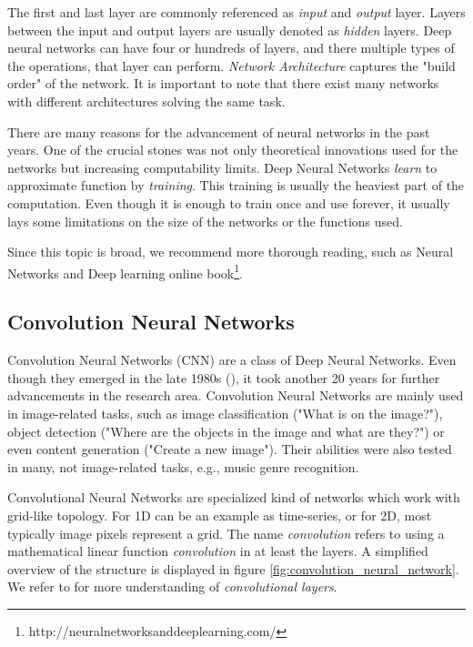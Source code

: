 The first and last layer are commonly referenced as \emph{input} and \emph{output} layer. Layers between the input and output layers are usually denoted as \emph{hidden} layers. Deep neural networks can have four or hundreds of layers, and there multiple types of the operations, that layer can perform. \emph{Network Architecture} captures the "build order" of the network. It is important to note that there exist many networks with different architectures solving the same task.

There are many reasons for the advancement of neural networks in the past years. One of the crucial stones was not only theoretical innovations used for the networks but increasing computability limits. Deep Neural Networks \emph{learn} to approximate function by \emph{training}. This training is usually the heaviest part of the computation. Even though it is enough to train once and use forever, it usually lays some limitations on the size of the networks or the functions used.

Since this topic is broad, we recommend more thorough reading, such as Neural Networks and Deep learning online book\footnote{http://neuralnetworksanddeeplearning.com/}.

\subsection{Convolution Neural Networks}

Convolution Neural Networks (CNN) are a class of Deep Neural Networks. Even though they emerged in the late 1980s (\cite{lecun1989backpropagation}), it took another 20 years for further advancements in the research area. Convolution Neural Networks are mainly used in image-related tasks, such as image classification ("What is on the image?"), object detection ("Where are the objects in the image and what are they?") or even content generation ("Create a new image"). Their abilities were also tested in many, not image-related tasks, e.g., music genre recognition.

Convolutional Neural Networks are specialized kind of networks which work with grid-like topology. For 1D can be an example as time-series, or for 2D, most typically image pixels represent a grid. The name \emph{convolution} refers to using a mathematical linear function \emph{convolution} in at least the layers. A simplified overview of the structure is displayed in figure \ref{fig:convolution_neural_network}. We refer to \cite{Goodfellow-et-al-2016} for more understanding of \emph{convolutional layers}.


